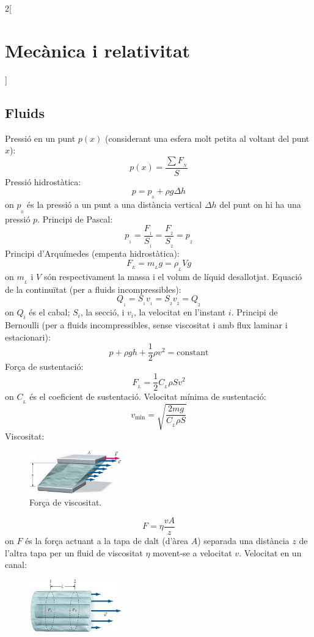 \documentclass[class=article,10pt,crop=false]{standalone}
\begin{document}
\begin{multicols}{2}[\section{Mecànica i relativitat}]
\subsection{Fluids}
Pressió en un punt $p(x)$ (considerant una esfera molt petita al voltant del punt $x$):
$$p(x)=\frac{\sum F_{\!_N}}{S}$$
Pressió hidrostàtica:
$$p=p_{\!_0}+\rho g\Delta h$$
{on $p_{\!_0}$ és la pressió a un punt a una distància vertical $\Delta h$ del punt on hi ha una pressió $p$.}\newline
Principi de Pascal:
$$p_{\!_1}=\frac{F_{\!_1}}{S_{\!_1}}=\frac{F_{\!_2}}{S_{\!_2}}=p_{\!_2}$$
Principi d'Arquímedes (empenta hi\-dros\-tà\-ti\-ca):
$$F_{\!_E}=m_{\!_L}g=\rho_{\!_L}Vg$$
{on $m_{\!_L}$ i $V$ són respectivament la massa i el volum de líquid desallotjat.}\newline
Equació de la continuïtat (per a fluids incompressibles):
$$Q_{\!_1}=S_{\!_1}v_{\!_1}=S_{\!_2}v_{\!_2}=Q_{\!_2}$$ {on $Q_i$ és el cabal; $S_i$, la secció, i $v_i$, la velocitat en l'instant $i$.}\newline
Principi de Bernoulli (per a fluids incompressibles, sense viscositat i amb flux laminar i estacionari):
$$p+\rho gh+\frac{1}{2}\rho v^2=\text{constant}$$
Força de sustentació:
$$F_{\!_L}=\frac{1}{2}C_{\!_L}\rho Sv^2$$
{on $C_{\!_L}$ és el coeficient de sustentació.}\newline
Velocitat mínima de sustentació:
$$v_{\text{min}}=\sqrt{\frac{2mg}{C_{\!_L}\rho S}}$$
Viscositat:\newline
\begin{figure}[ht]
    \centering
    \includegraphics[width=4cm]{Physics/1st/Mecanica_i_relativitat/Imatges/vis.jpg}
    \caption{Força de viscositat.}
\end{figure}
$$F=\eta\frac{vA}{z}$$
{on $F$ és la força actuant a la tapa de dalt (d'àrea $A$) separada una distància $z$ de l'altra tapa per un fluid de viscositat $\eta$ movent-se a velocitat $v$.}\newline
Velocitat en un canal:\newline
\begin{figure}[ht]
    \centering
    \includegraphics[width=4cm]{Physics/1st/Mecanica_i_relativitat/Imatges/vis2.jpg}

\end{figure}
\end{multicols}
\end{document}
